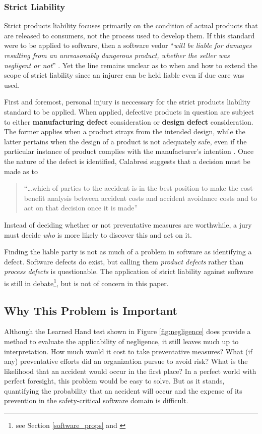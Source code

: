 \subsubsection{Strict Liability}
Strict products liability focuses primarily on the condition of actual products
that are released to consumers, not the process used to develop them. If this
standard were to be applied to software, then a software vedor ``\textit{will be
liable for damages resulting from an unreasonably dangerous product, whether the
seller was negligent or not}'' \cite{Burgunder2004}. Yet the line remains
unclear as to when and how to extend the scope of strict liability since an
injurer can be held liable even if due care was used.

First and foremost, personal injury is neccessary for the strict products
liability standard to be applied. When applied, defective products in question
are subject to either \textbf{manufacturing defect} consideration or
\textbf{design defect} consideration. The former applies when a product strays
from the intended design, while the latter pertains when the design of a product
is not adequately safe, even if the particular instance of product complies with
the manufacturer's intention \cite{Turner1999}. Once the nature of the defect is
identified, Calabresi suggests that  a decision must be made as to 
\begin{quote}
``\ldots which of parties to the accident is in the best position to make the
cost-benefit analysis between accident costs and accident avoidance costs and to
act on that decision once it is made'' \cite{Calabresi1972}
\end{quote}
 Instead of deciding whether or not preventative
measures are worthwhile, a jury must decide \textit{who} is more likely to 
discover this and act on it.

Finding the liable party is not as much of a problem in software as identifying
a defect. Software defects do exist, but calling them \textit{product defects} 
rather than \textit{process defects} is questionable. The application of strict
liability against software is still in debate\footnote{see Section
\ref{software_props} and \cite{Turner2000}}, but is not of concern in this
paper.

\subsection{Why This Problem is Important}
Although the Learned Hand test shown in Figure \ref{fig:negligence} does provide
a method to evaluate the applicability of negligence, it still leaves much up to
interpretation. How much would it cost to take preventative measures? What
(if any) preventative efforts did an organization pursue to avoid risk? What is
the likelihood that an accident would occur in the first place? In a perfect
world with perfect foresight, this problem would be easy to solve. But as it
stands, quantifying the probability that an accident will occur and the expense
of its prevention in the safety-critical software domain is difficult.

